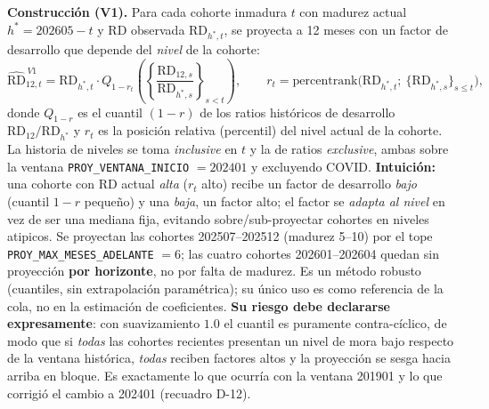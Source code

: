 \documentclass[12pt, a4paper]{article}
\newcommand{\RD}{\ensuremath{\mathrm{RD}}}
\begin{document}
\textbf{Construcción (V1).} Para cada cohorte inmadura $t$ con madurez actual $h^\ast=202605-t$ y
RD observada $\RD_{h^\ast,t}$, se proyecta a 12 meses con un factor de desarrollo que depende del
\emph{nivel} de la cohorte:
\begin{equation}
  \widehat{\RD}^{\,V1}_{12,t} = \RD_{h^\ast,t}\cdot Q_{1-r_t}\!\left(\left\{\frac{\RD_{12,s}}{\RD_{h^\ast,s}}\right\}_{s<t}\right),
  \qquad r_t = \mathrm{percentrank}\big(\RD_{h^\ast,t};\ \{\RD_{h^\ast,s}\}_{s\le t}\big),
\end{equation}
donde $Q_{1-r}$ es el cuantil $(1-r)$ de los ratios históricos de desarrollo $\RD_{12}/\RD_{h^\ast}$
y $r_t$ es la posición relativa (percentil) del nivel actual de la cohorte. La historia de niveles
se toma \emph{inclusive} en $t$ y la de ratios \emph{exclusive}, ambas sobre la ventana
\texttt{PROY\_VENTANA\_INICIO} $=202401$ y excluyendo COVID. \textbf{Intuición:}
una cohorte con RD actual \emph{alta} ($r_t$ alto) recibe un factor de desarrollo \emph{bajo}
(cuantil $1-r$ pequeño) y una \emph{baja}, un factor alto; el factor se \emph{adapta al nivel} en
vez de ser una mediana fija, evitando sobre/sub-proyectar cohortes en niveles atipicos. Se
proyectan las cohortes 202507--202512 (madurez 5--10) por el tope
\texttt{PROY\_MAX\_MESES\_ADELANTE} $=6$; las cuatro cohortes 202601--202604 quedan sin proyección
\textbf{por horizonte}, no por falta de madurez. Es un método robusto (cuantiles, sin
extrapolación paramétrica); su único uso es como referencia de la cola, no en la estimación de
coeficientes. \textbf{Su riesgo debe declararse expresamente}: con suavizamiento $1.0$ el cuantil es puramente
contra-cíclico, de modo que si \emph{todas} las cohortes recientes presentan un nivel de mora bajo
respecto de la ventana histórica, \emph{todas} reciben factores altos y la proyección se sesga
hacia arriba en bloque. Es exactamente lo que ocurría con la ventana 201901 y lo que corrigió el
cambio a 202401 (recuadro D-12).
\end{document}

